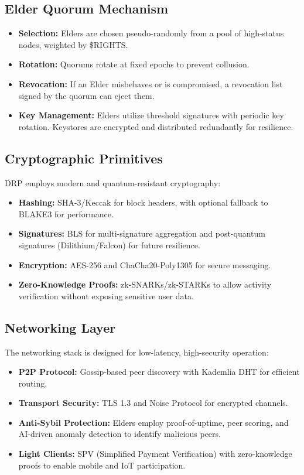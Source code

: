 \documentclass[11pt,a4paper]{article}
\begin{document}
\subsection{Elder Quorum Mechanism}
\begin{itemize}
    \item \textbf{Selection:} Elders are chosen pseudo-randomly from a pool of high-status nodes, weighted by \$RIGHTS.
    \item \textbf{Rotation:} Quorums rotate at fixed epochs to prevent collusion.
    \item \textbf{Revocation:} If an Elder misbehaves or is compromised, a revocation list signed by the quorum can eject them.
    \item \textbf{Key Management:} Elders utilize threshold signatures with periodic key rotation. Keystores are encrypted and distributed redundantly for resilience.
\end{itemize}

\subsection{Cryptographic Primitives}
DRP employs modern and quantum-resistant cryptography:
\begin{itemize}
    \item \textbf{Hashing:} SHA-3/Keccak for block headers, with optional fallback to BLAKE3 for performance.
    \item \textbf{Signatures:} BLS for multi-signature aggregation and post-quantum signatures (Dilithium/Falcon) for future resilience.
    \item \textbf{Encryption:} AES-256 and ChaCha20-Poly1305 for secure messaging.
    \item \textbf{Zero-Knowledge Proofs:} zk-SNARKs/zk-STARKs to allow activity verification without exposing sensitive user data.
\end{itemize}

\subsection{Networking Layer}
The networking stack is designed for low-latency, high-security operation:
\begin{itemize}
    \item \textbf{P2P Protocol:} Gossip-based peer discovery with Kademlia DHT for efficient routing.
    \item \textbf{Transport Security:} TLS 1.3 and Noise Protocol for encrypted channels.
    \item \textbf{Anti-Sybil Protection:} Elders employ proof-of-uptime, peer scoring, and AI-driven anomaly detection to identify malicious peers.
    \item \textbf{Light Clients:} SPV (Simplified Payment Verification) with zero-knowledge proofs to enable mobile and IoT participation.
\end{itemize}
\end{document}
